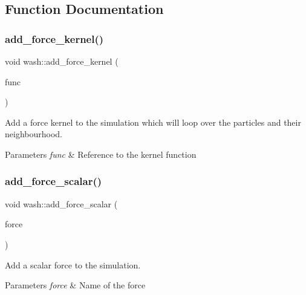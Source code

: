 \subsection{Function Documentation}
\mbox{\label{namespacewash_a2ffa21a9e32d3ca6ce87def3e7db4837}} 
\subsubsection{\texorpdfstring{add\+\_\+force\+\_\+kernel()}{add\_force\_kernel()}}
{\footnotesize\ttfamily void wash\+::add\+\_\+force\+\_\+kernel (\begin{DoxyParamCaption}\item[{const Force\+FuncT}]{func }\end{DoxyParamCaption})}



Add a force kernel to the simulation which will loop over the particles and their neighbourhood. 


\begin{DoxyParams}{Parameters}
{\em func} & Reference to the kernel function \\
\hline
\end{DoxyParams}
\mbox{\label{namespacewash_a6103b7efdcc3045c8d2aae4d5598e7ae}} 
\subsubsection{\texorpdfstring{add\+\_\+force\+\_\+scalar()}{add\_force\_scalar()}}
{\footnotesize\ttfamily void wash\+::add\+\_\+force\+\_\+scalar (\begin{DoxyParamCaption}\item[{const std\+::string}]{force }\end{DoxyParamCaption})}



Add a scalar force to the simulation. 


\begin{DoxyParams}{Parameters}
{\em force} & Name of the force \\
\hline
\end{DoxyParams}
\mbox{\label{namespacewash_a9f85f4ec09db604cb09806616365a5b8}} 
